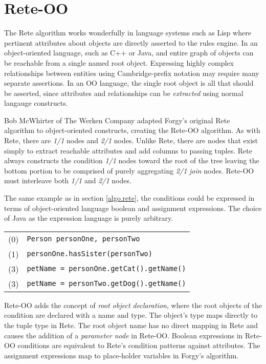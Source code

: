 \section{Rete-OO}

The Rete algorithm works wonderfully in language systems 
such as Lisp where pertinent attributes about objects 
are directly asserted to the rules engine.  In an
object-oriented language, such as C++ or Java, and entire 
graph of objects can be reachable from a single named 
root object.  Expressing highly complex relationships between
entities using Cambridge-prefix notation may require many
separate assertions.  In an OO language, the single root
object is all that should be asserted, since attributes 
and relationships can be \emph{extracted} using normal
langauge constructs.

Bob McWhirter of The Werken Company adapted Forgy's original Rete 
algorithm to object-oriented constructs, creating the Rete-OO algorithm.
As with Rete, there are \emph{1/1} nodes and \emph{2/1}
nodes.  Unlike Rete, there are nodes that exist simply 
to extract reachable attributes and add columns to passing
tuples. Rete always constructs the condition \emph{1/1} nodes toward
the root of the tree leaving the bottom portion to be 
comprised of purely aggregating \emph{2/1} \emph{join} nodes.  
Rete-OO must interleave both \emph{1/1} and \emph{2/1} nodes.

The same example as in section \ref{algo.rete}, 
the conditions could be expressed in terms of object-oriented
language boolean and assignment expressions.  The choice
of Java as the expression language is purely arbitrary.

\medskip

\begin{tabular}{cl}
(0) & \texttt{Person personOne, personTwo} \\
(1) & \texttt{personOne.hasSister(personTwo)} \\
(3) & \texttt{petName = personOne.getCat().getName()} \\
(3) & \texttt{petName = personTwo.getDog().getName()} \\
\end{tabular}

\bigskip

Rete-OO adds the concept of \emph{root object declaration}, where 
the root objects of the condition are declared with a
name and type.  The object's type maps directly to the
tuple type in Rete.  The root object name has no direct
mapping in Rete and causes the addition of a \emph{parameter node}
in Rete-OO.  Boolean expressions in Rete-OO conditions are
equivalent to Rete's condition patterns against attributes.
The assignment expressions map to place-holder variables in
Forgy's algorithm.

